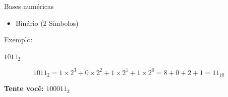 

\begin{frame}{Bases numéricas}
    \begin{itemize}
        \item Binário (2 Símbolos)
    \end{itemize}

    \vspace{0.5cm}

    Exemplo:

    \begin{center}
        $1011_{2}$
    \end{center}

    \[
        1011_{2}
        = 1 \times 2^{3}
        + 0 \times 2^{2}
        + 1 \times 2^{1}
        + 1 \times 2^{0}
        = 8 + 0 + 2 + 1
        = 11_{10}
    \]

    \vspace{0.5cm}

    \textbf{Tente você:} $100011_{2}$

\end{frame}